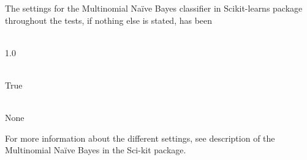 The settings for the Multinomial Naïve Bayes classifier in Scikit-learns package throughout the tests, if nothing else is stated, has been
\begin{description}
	\item[Alpha] \ \\1.0
	\item[Fit prior]\ \\ True
	\item[Class prior] \ \\None
\end{description}
For more information about the different settings, see description of the Multinomial Naïve Bayes in the Sci-kit package.